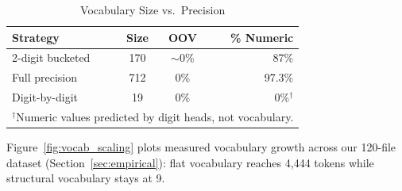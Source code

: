 \documentclass[11pt]{article}
\begin{document}
\begin{table}[htbp]
\centering
\caption{Vocabulary Size vs.\ Precision}
\label{tab:vocab_comparison}
\begin{tabular}{@{}lccr@{}}
\toprule
\textbf{Strategy} & \textbf{Size} & \textbf{OOV} & \textbf{\% Numeric} \\
\midrule
2-digit bucketed   & 170  & $\sim$0\%  & 87\% \\
Full precision     & 712  & 0\%        & 97.3\% \\
Digit-by-digit     & 19   & 0\%        & 0\%$^\dagger$ \\
\bottomrule
\multicolumn{4}{l}{\footnotesize $^\dagger$Numeric values predicted by digit heads, not vocabulary.}
\end{tabular}
\end{table}

Figure~\ref{fig:vocab_scaling} plots measured vocabulary growth across our 120-file dataset (Section~\ref{sec:empirical}): flat vocabulary reaches 4{,}444 tokens while structural vocabulary stays at 9.
\end{document}
